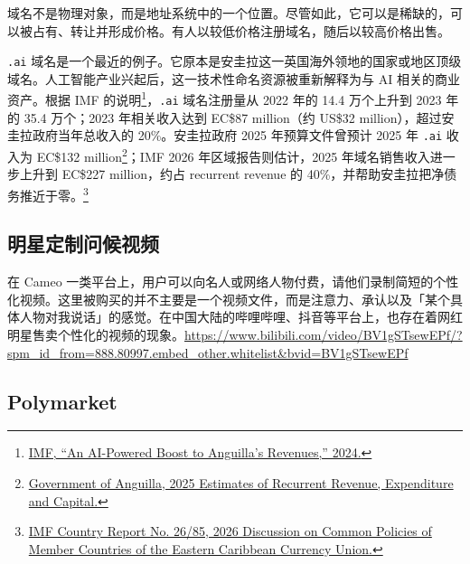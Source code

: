 \documentclass[UTF8,10pt,a4paper,scheme=chinese,fontset=none]{ctexart}
\begin{document}
域名不是物理对象，而是地址系统中的一个位置。尽管如此，它可以是稀缺的，可以被占有、转让并形成价格。有人以较低价格注册域名，随后以较高价格出售。

\texttt{.ai} 域名是一个最近的例子。它原本是安圭拉这一英国海外领地的国家或地区顶级域名。人工智能产业兴起后，这一技术性命名资源被重新解释为与 AI 相关的商业资产。根据 IMF 的说明\footnote{\href{https://www.imf.org/en/news/articles/2024/05/15/cf-an-ai-powered-boost-to-anguillas-revenues}{IMF, ``An AI-Powered Boost to Anguilla's Revenues,'' 2024.}}，\texttt{.ai} 域名注册量从 2022 年的 14.4 万个上升到 2023 年的 35.4 万个；2023 年相关收入达到 EC\$87 million（约 US\$32 million），超过安圭拉政府当年总收入的 20\%。安圭拉政府 2025 年预算文件曾预计 2025 年 \texttt{.ai} 收入为 EC\$132 million\footnote{\href{https://www.gov.ai/document/2026-03-18-011900_862974747.pdf}{Government of Anguilla, 2025 Estimates of Recurrent Revenue, Expenditure and Capital.}}；IMF 2026 年区域报告则估计，2025 年域名销售收入进一步上升到 EC\$227 million，约占 recurrent revenue 的 40\%，并帮助安圭拉把净债务推近于零。\footnote{\href{https://www.imf.org/-/media/files/publications/cr/2026/english/1eccea2026001-source-pdf.pdf}{IMF Country Report No. 26/85, 2026 Discussion on Common Policies of Member Countries of the Eastern Caribbean Currency Union.}}


\subsection{明星定制问候视频}

在 Cameo 一类平台上，用户可以向名人或网络人物付费，请他们录制简短的个性化视频。这里被购买的并不主要是一个视频文件，而是注意力、承认以及「某个具体人物对我说话」的感觉。在中国大陆的哔哩哔哩、抖音等平台上，也存在着网红明星售卖个性化的视频的现象。\url{https://www.bilibili.com/video/BV1gSTsewEPf/?spm_id_from=888.80997.embed_other.whitelist&bvid=BV1gSTsewEPf}

\subsection{Polymarket}
\end{document}
